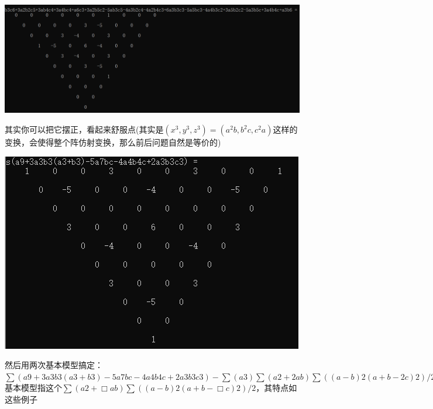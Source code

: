 \documentclass[UTF8]{ctexart}
\begin{document}
\subsection{}
\begin{center}
	\includegraphics[width=1\linewidth]{a40}
\end{center}
其实你可以把它摆正，看起来舒服点(其实是$ (x^{3},y^{3},z^{3})=(a^{2}b,b^{2}c,c^{2}a) $这样的变换，会使得整个阵仿射变换，那么前后问题自然是等价的)
\begin{center}
	\includegraphics[width=0.85\linewidth]{a41}
\end{center}
然后用两次基本模型搞定：$ \displaystyle \sum (a9+3a3b3(a3+b3)-5a7bc-4a4b4c+2a3b3c3)-\displaystyle \sum (a3)\displaystyle \sum (a2+2ab)\displaystyle \sum ((a-b)2(a+b-2c)2)/2-abc\displaystyle \sum (a2+7/3ab)\displaystyle \sum ((a-b)2(a+b-7/3c)2)/2 $\\
基本模型指这个$ \displaystyle \sum (a2+\Box ab)\displaystyle \sum ((a-b)2(a+b-\Box c)2)/2 $，其特点如这些例子
\end{document}
